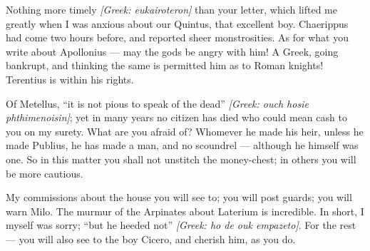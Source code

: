

 Nothing more timely \textit{[Greek: eukairoteron]} than your letter, which lifted me greatly when I was anxious about our Quintus, that excellent boy. Chaerippus had come two hours before, and reported sheer monstrosities. As for what you write about Apollonius --- may the gods be angry with him! A Greek, going bankrupt, and thinking the same is permitted him as to Roman knights! Terentius is within his rights.

 Of Metellus, ``it is not pious to speak of the dead'' \textit{[Greek: ouch hosie phthimenoisin]}; yet in many years no citizen has died who could mean cash to you on my surety. What are you afraid of? Whomever he made his heir, unless he made Publius, he has made a man, and no scoundrel --- although he himself was one. So in this matter you shall not unstitch the money-chest; in others you will be more cautious.

 My commissions about the house you will see to; you will post guards; you will warn Milo. The murmur of the Arpinates about Laterium is incredible. In short, I myself was sorry; ``but he heeded not'' \textit{[Greek: ho de ouk empazeto]}. For the rest --- you will also see to the boy Cicero, and cherish him, as you do.
